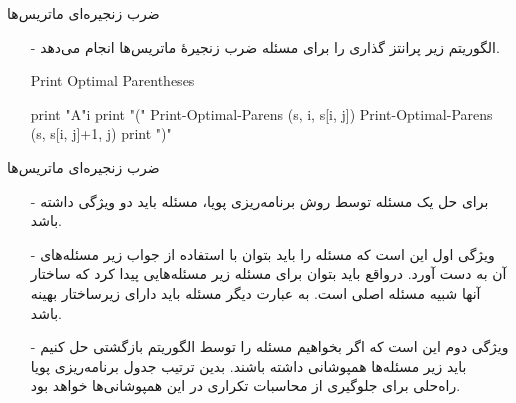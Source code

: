 \begin{frame}{‌ضرب زنجیره‌ای ماتریس‌ها}
\begin{itemize}\itemr
\item[-]
الگوریتم زیر پرانتز گذاری را برای مسئله ضرب زنجیرهٔ ماتریس‌ها انجام می‌دهد.
\begin{algorithm}[H]\alglr
  \caption{Print Optimal Parentheses} 
  \begin{algorithmic}[1]
   		\State print "A"i
   		\Else 
   		\State print "("
   		\State Print-Optimal-Parens (s, i, s[i, j])
   		\State Print-Optimal-Parens (s, s[i, j]+1, j)
   		\State print ")"
   	\EndIf
  \end{algorithmic}
  \label{alg:merge}
\end{algorithm}   
\end{itemize}
\end{frame}


\begin{frame}{‌ضرب زنجیره‌ای ماتریس‌ها}
\begin{itemize}\itemr
\item[-]
برای حل یک مسئله توسط روش برنامه‌ریزی پویا، مسئله باید دو ویژگی داشته باشد.
\item[-]
ویژگی اول این است که مسئله را باید بتوان با استفاده از جواب زیر مسئله‌های آن به دست آورد. درواقع باید بتوان برای مسئله زیر مسئله‌هایی پیدا کرد که ساختار آنها شبیه مسئله اصلی است.
به عبارت دیگر مسئله باید دارای زیرساختار بهینه باشد.
\item[-]
 ویژگی دوم این است که اگر بخواهیم مسئله را توسط الگوریتم بازگشتی حل کنیم باید زیر مسئله‌ها همپوشانی داشته باشند. بدین ترتیب جدول برنامه‌ریزی پویا راه‌حلی برای جلوگیری از محاسبات تکراری در این همپوشانی‌ها خواهد بود.
\end{itemize}
\end{frame}